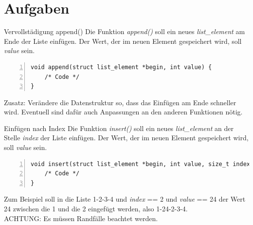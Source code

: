 
\section{Aufgaben}
\begin{frame}[fragile]{Vervollstädigung append()}
Die Funktion \textit{append()} soll ein neues \textit{list\_element} am Ende der Liste einfügen. Der Wert, der im neuen Element gespeichert wird, soll \textit{value} sein.
\begin{lstlisting}[numbers=left]
void append(struct list_element *begin, int value) {
    /* Code */
}
\end{lstlisting}
Zusatz: Verändere die Datenstruktur so, dass das Einfügen am Ende schneller wird. Eventuell sind dafür auch Anpassungen an den anderen Funktionen nötig.
\end{frame}
 

\begin{frame}[fragile]{Einfügen nach Index}
Die Funktion \textit{insert()} soll ein neues \textit{list\_element} an der Stelle \textit{index} der Liste einfügen. Der Wert, der im neuen Element gespeichert wird, soll \textit{value} sein.
\begin{lstlisting}[numbers=left]
void insert(struct list_element *begin, int value, size_t index) {
    /* Code */
}
\end{lstlisting}
Zum Beispiel soll in die Liste 1-2-3-4 und \textit{index} == 2 und \textit{value} == 24 der Wert 24 zwischen die 1 und die 2 eingefügt werden, also 1-24-2-3-4.\\
ACHTUNG: Es müssen Randfälle beachtet werden.
\end{frame}
 

